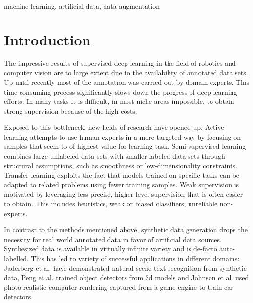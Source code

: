 \documentclass[conference]{IEEEtran}
\begin{document}
\begin{IEEEkeywords}
machine learning, artificial data, data augmentation
\end{IEEEkeywords}

\section{Introduction}
The impressive results of supervised deep learning in the field of robotics and computer vision are to large extent due to the availability of annotated data sets. Up until recently most of the annotation was carried out by domain experts. This time consuming process significantly slows down the progress of deep learning efforts. In many tasks it is difficult, in most niche areas impossible, to obtain strong supervision because of the high costs.

Exposed to this bottleneck, new fields of research have opened up. Active learning \cite{druck2009active, settles2012active, cakmak2012designing} attempts to use human experts in a more targeted way by focusing on samples that seem to of highest value for learning task. Semi-supervised learning \cite{chapelle2009semi, salimans2016improved, zhu2006semi} combines large unlabeled data sets with smaller labeled data sets through structural assumptions, such as smoothness or low-dimensionality constraints. Transfer learning \cite{pratt1993discriminability, ventura2007theoretical, pan2010survey} exploits the fact that models trained on specific tasks can be adapted to related problems using fewer training samples. Weak supervision \cite{ratner2016data, zhou2017brief} is motivated by leveraging less precise, higher level supervision that is often easier to obtain. This includes heuristics, weak or biased classifiers, unreliable non-experts. 


In contrast to the methods mentioned above, synthetic data generation drops the necessity for real world annotated data in favor of artificial data sources. Synthesized data is available in virtually infinite variety and is de-facto auto-labelled. This has led to variety of successful applications in different domains: Jaderberg et al. \cite{jaderberg2014synthetic} have demonstrated natural scene text recognition from synthetic data, Peng et al. \cite{peng2015learning} trained object detectors from 3d models and Johnson et al. \cite{2017_Johnson_DrivingInTheMatrix} used photo-realistic computer rendering captured from a game engine to train car detectors. 
\end{document}
